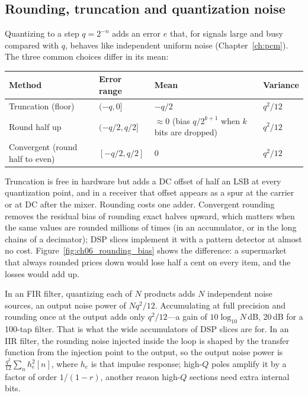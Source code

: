 \subsection{Rounding, truncation and quantization noise}

Quantizing to a step $q=2^{-n}$ adds an error $e$ that, for signals large and busy compared with
$q$, behaves like independent uniform noise (Chapter~\ref{ch:pcm}). The three common choices differ
in its mean:
\begin{center}
\begin{tabular}{llp{5.2cm}l}
\toprule
Method & Error range & Mean & Variance \\
\midrule
Truncation (floor) & $(-q,0]$ & $-q/2$ & $q^2/12$ \\
Round half up & $(-q/2,q/2]$ & $\approx0$ (bias $q/2^{k+1}$ when $k$ bits are dropped) & $q^2/12$ \\
Convergent (round half to even) & $[-q/2,q/2]$ & 0 & $q^2/12$ \\
\bottomrule
\end{tabular}
\end{center}
Truncation is free in hardware but adds a DC offset of half an LSB at every quantization point, and
in a receiver that offset appears as a spur at the carrier or at DC after the mixer. Rounding
costs one adder. Convergent rounding removes the residual bias of rounding exact halves upward, which
matters when the same values are rounded millions of times (in an accumulator, or in the long chains
of a decimator); DSP slices implement it with a pattern detector at almost no cost.
Figure~\ref{fig:ch06_rounding_bias} shows the difference: a supermarket that always rounded prices
down would lose half a cent on every item, and the losses would add up.


In an FIR filter, quantizing each of $N$ products adds $N$ independent noise sources, an output
noise power of $Nq^2/12$. Accumulating at full precision and rounding once at the output adds only
$q^2/12$---a gain of $10\log_{10}N$\,dB, 20\,dB for a 100-tap filter. That is what the wide
accumulators of DSP slices are for. In an IIR filter, the rounding noise injected inside the loop is
shaped by the transfer function from the injection point to the output, so the output noise power
is $\frac{q^2}{12}\sum_n h_e^2[n]$, where $h_e$ is that impulse response; high-$Q$ poles amplify
it by a factor of order $1/(1-r)$, another reason high-$Q$ sections need extra internal bits.

